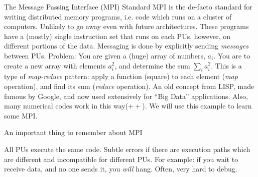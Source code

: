 \documentclass[aspectratio=169]{beamer}
\newcommand{\mypause}{\pause}
\begin{document}
\begin{frame}{The Message Passing Interface (MPI) Standard}
  \footnotesize%
  MPI is the de-facto standard for writing {\color{blue} distributed
    memory} programs, i.e. code which runs on a cluster of
  computers. Unlikely to go away even with future architectures.%
  \vskip0.1in%
  These programs have a (mostly) single instruction set that runs on
  each PUs, however, on different portions of the data. Messaging is
  done by explicitly sending \emph{messages} between PUs.%
  \vskip0.1in%
  \mypause%
  {\color{blue} Problem: You are given a (huge) array of numbers,
    $a_i$. You are to create a new array with elements $a_i^2$, and
    determine the sum $\sum_i a_i^2$.}%
  \mypause%
  \vskip0.1in%
  This is a type of \emph{map-reduce} pattern: apply a function
  (square) to each element (\emph{map} operation), and find its sum
  (\emph{reduce} operation). An old concept from LISP, made famous by
  Google, and now used extensively for ``Big Data''
  applications. Also, many numerical codes work in this way($++$).%
  \vskip0.1in%
  We will use this example to learn some MPI.
\end{frame}

\begin{frame}{An important thing to remember about MPI}

  {\color{blue} All PUs execute the same code. Subtle errors if there
    are execution paths which are different and incompatible for
    different PUs. For example: if you wait to receive data, and no
    one sends it, you \emph{will} hang. Often, very hard to debug.}

\end{frame}
\end{document}
